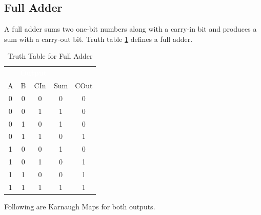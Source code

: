 \subsection{Full Adder}
\label{CL:subsec:full_adder}

A full adder sums two one-bit numbers along with a carry-in bit and produces a sum with a carry-out bit. Truth table \ref{CL:tab:truth_table_for_full_adder} defines a full adder. 

\begin{table}[H]
  \sffamily
  \newcommand{\head}[1]{\textcolor{white}{\textbf{#1}}}    
  \begin{center}
    \begin{tabular}{ccc|cc} 
      \rowcolor{black!75}
      \multicolumn{3}{c}{\head{Inputs}} & \multicolumn{2}{c}{\head{Output}} \\
      A & B & CIn & Sum & COut \\
      \hline
      0 & 0 & 0 & 0 & 0 \\
      0 & 0 & 1 & 1 & 0 \\
      0 & 1 & 0 & 1 & 0 \\
      0 & 1 & 1 & 0 & 1 \\
      1 & 0 & 0 & 1 & 0 \\
      1 & 0 & 1 & 0 & 1 \\
      1 & 1 & 0 & 0 & 1 \\
      1 & 1 & 1 & 1 & 1
    \end{tabular}
  \end{center}
  \caption{Truth Table for Full Adder}
  \label{CL:tab:truth_table_for_full_adder}
\end{table}

Following are Karnaugh Maps for both outputs.

